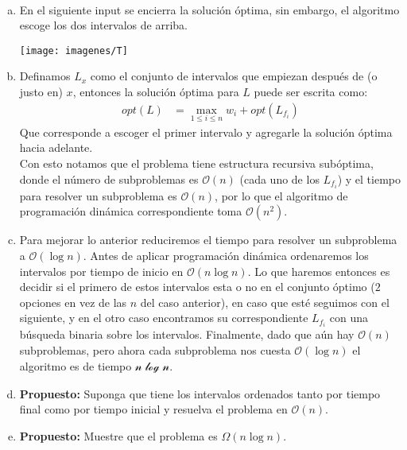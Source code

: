 \documentclass[dcc,uchile]{fcfmcourse}
\theoremstyle{plain}
\theoremstyle{definition}
\begin{document}
\begin{problems}
\\
\begin{enumerate}[a)]
    \item En el siguiente input se encierra la solución óptima, sin embargo, el algoritmo escoge los dos intervalos de arriba.
    \begin{center}
        \texttt{[image: imagenes/T]}
    \end{center}
    \item Definamos $L_x$ como el conjunto de intervalos que empiezan después de (o justo en) $x$, entonces la solución óptima para $L$ puede ser escrita como:
    \begin{align*}
        opt(L) &= \max_{1\le i \le n} {w_{i} + opt(L_{f_{i}})}
    \end{align*}
    Que corresponde a escoger el primer intervalo y agregarle la solución óptima hacia adelante.\\
    Con esto notamos que el problema tiene estructura recursiva subóptima, donde el número de subproblemas es $\mathcal{O}(n)$ (cada uno de los $L_{f_{i}}$) y el tiempo para resolver un subproblema es $\mathcal{O}(n)$, por lo que el algoritmo de programación dinámica correspondiente toma $\mathcal{O}(n^2)$.
    \item Para mejorar lo anterior reduciremos el tiempo para resolver un subproblema a $\mathcal{O}(\log{n})$. Antes de aplicar programación dinámica ordenaremos los intervalos por tiempo de inicio en $\mathcal{O}(n\log{n})$. Lo que haremos entonces es decidir si el primero de estos intervalos esta o no en el conjunto óptimo ($2$ opciones en vez de las $n$ del caso anterior), en caso que esté seguimos con el siguiente, y en el otro caso encontramos su correspondiente $L_{f_{i}}$ con una búsqueda binaria sobre los intervalos. Finalmente, dado que aún hay $\mathcal{O}(n)$ subproblemas, pero ahora cada subproblema nos cuesta $\mathcal{O}(\log{n})$ el algoritmo es de tiempo $\mathcal{n\log{n}}$.
    \item \textbf{Propuesto:} Suponga que tiene los intervalos ordenados tanto por tiempo final como por tiempo inicial y resuelva el problema en $\mathcal{O}(n)$.
    \item \textbf{Propuesto:} Muestre que el problema es $\Omega(n\log{n})$.
\end{enumerate}
\end{problems}
\end{document}
